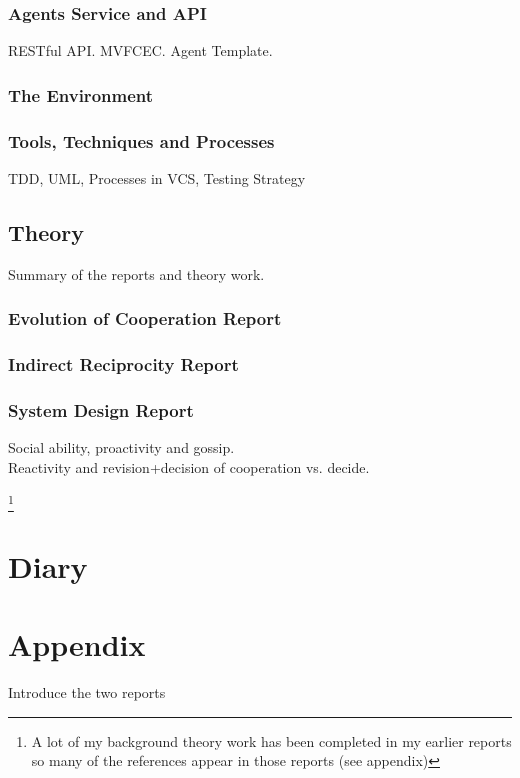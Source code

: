 \documentclass[]{final_report}
\begin{document}
\subsection{Agents Service and API}
RESTful API. MVFCEC. Agent Template.

\subsection{The Environment}

\subsection{Tools, Techniques and Processes}
TDD, UML, Processes in VCS, Testing Strategy

\section{Theory}
Summary of the reports and theory work.
\subsection{Evolution of Cooperation Report}

\subsection{Indirect Reciprocity Report}

\subsection{System Design Report}
Social ability, proactivity and gossip.\\
Reactivity and revision+decision of cooperation vs. decide.\\

\newpage
{}

\footnote{A lot of my background theory work has been completed in my earlier reports so many of the references appear in those reports (see appendix)}
\label{endpage}

\chapter{Diary}

\chapter{Appendix}
\label{appendix}
Introduce the two reports

%

%

%
\end{document}
